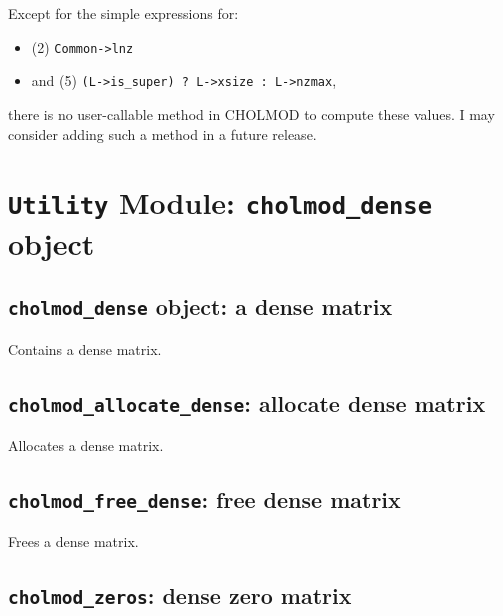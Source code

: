 \documentclass[11pt]{article}
\begin{document}
Except for the simple expressions for:

\begin{itemize}
\item
(2) \verb'Common->lnz'
\item
and (5) \verb'(L->is_super) ? L->xsize : L->nzmax',
\end{itemize}

there is no user-callable method in CHOLMOD to compute these values.
I may consider adding such a method in a future release.

\newpage \section{{\tt Utility} Module: {\tt cholmod\_dense} object}
\label{cholmod_dense}

\subsection{{\tt cholmod\_dense} object: a dense matrix}


Contains a dense matrix.

\subsection{{\tt cholmod\_allocate\_dense}: allocate dense matrix}


Allocates a dense matrix.

\subsection{{\tt cholmod\_free\_dense}: free dense matrix}


Frees a dense matrix.


\subsection{{\tt cholmod\_zeros}: dense zero matrix}
\end{document}
